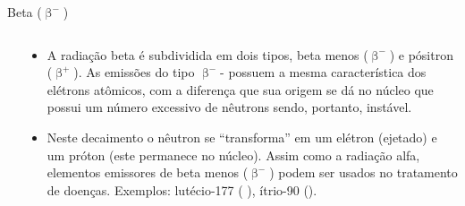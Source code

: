 \documentclass[presentation,professionalfonts,aspectratio=169]{beamer}
\begin{document}
\begin{frame}[label={sec:org370db94}]{Beta (\(\upbeta^-\))}
\begin{columns}
\begin{column}{0.45\columnwidth}
\end{column}

\begin{column}{0.45\columnwidth}
\small

\begin{itemize}
\item A radiação beta é subdividida em dois tipos, beta menos (\(\upbeta ^-\)) e pósitron (\(\upbeta ^+\)). As emissões do tipo \(\upbeta ^-\)- possuem a mesma característica dos elétrons atômicos, com a diferença que sua origem se dá no núcleo que possui um número excessivo de nêutrons sendo, portanto, instável.
\item Neste decaimento o nêutron se “transforma” em um elétron (ejetado) e um próton (este permanece no núcleo). Assim como a  radiação  alfa,  elementos  emissores  de  beta  menos  (\(\upbeta ^-\))  podem  ser  usados  no  tratamento de doenças. Exemplos: lutécio-177 ( ),  ítrio-90 ().
\end{itemize}
\end{column}
\end{columns}
\end{frame}
\end{document}
